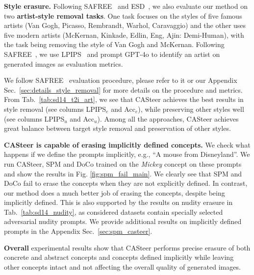 \noindent \textbf{Style erasure.} Following SAFREE~\cite{DBLP:journals/corr/abs-2410-12761} and ESD~\cite{DBLP:conf/iccv/GandikotaMFB23}, we also evaluate our method on two \textbf{artist-style removal
tasks}. One task focuses on the styles of five famous artists (Van Gogh, Picasso, Rembrandt, Warhol,
Caravaggio) and the other uses five modern artists (McKernan, Kinkade, Edlin, Eng, Ajin: Demi-Human), with the task being removing the style of Van Gogh and McKernan. Following SAFREE~\cite{DBLP:journals/corr/abs-2410-12761}, we use LPIPS~\cite{8578166} and prompt GPT-4o to identify an artist on generated images as evaluation metrics. 

%
%



We follow SAFREE~\cite{DBLP:journals/corr/abs-2410-12761} evaluation procedure, please refer 
to it or our Appendix Sec.~\ref{sec:details_style_removal} for more details on the procedure and metrics.
%
From Tab.~\ref{tab:sd14_t2i_art}, we see that CASteer achieves the best results in style removal (see columns LPIPS$_e$ and Acc$_e$), while preserving other styles well (see columns LPIPS$_u$ and Acc$_u$). 
%
Among all the approaches, CASteer achieves great balance between target style removal and preservation of other styles.

\noindent \textbf{CASteer is capable of erasing implicitly defined concepts.} We check what happens if we define the prompts implicitly, e.g., ``A mouse from Disneyland''. We run CASteer, SPM and DoCo trained on the \textit{Mickey} concept on these prompts and show the results in Fig. \ref{fig:spm_fail_main}.
%
We clearly see that SPM and DoCo fail to erase the concepts when they are not explicitly defined.
%
In contrast, our method does a much better job of erasing the concepts, despite being implicitly defined. This is also supported by the results on nudity erasure in Tab.~\ref{tab:sd14_nudity}, as considered datasets contain specially selected adversarial nudity prompts.
%
We provide additional results on implicitly defined prompts in the Appendix Sec.~\ref{sec:spm_casteer}. %


\noindent \textbf{Overall} experimental results show that CASteer performs precise erasure of both concrete and abstract concepts and concepts defined implicitly while leaving other concepts intact and not affecting the overall quality of generated images.
%
\vspace{-0.3cm}

